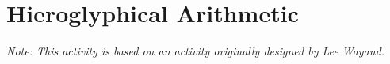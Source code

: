 \newpage
\section{Hieroglyphical Arithmetic}\label{A:HAr}
\emph{Note: This activity is based on an activity originally designed by Lee Wayand.}




\newcommand{\lo}{\vcenter{\hbox{\textproto{a}}}}
\newcommand{\loo}{\vcenter{\hbox{\textproto{d}}}}
\newcommand{\la}{\vcenter{\hbox{\textproto{w}}}}
\newcommand{\lb}{\vcenter{\hbox{\textproto{H}}}}
\newcommand{\lc}{\vcenter{\hbox{\textproto{T}}}}
\newcommand{\ld}{\vcenter{\hbox{\textproto{K}}}}
\newcommand{\lf}{\vcenter{\hbox{\textproto{E}}}}
\newcommand{\lh}{\vcenter{\hbox{\textproto{l}}}}
\newcommand{\li}{\vcenter{\hbox{\textproto{o}}}}
\newcommand{\lx}{\vcenter{\hbox{\textproto{x}}}}
\newcommand{\ly}{\vcenter{\hbox{\textproto{R}}}}
\newcommand{\lz}{\vcenter{\hbox{\textproto{v}}}}
\newcommand{\lw}{\vcenter{\hbox{\textproto{q}}}}



